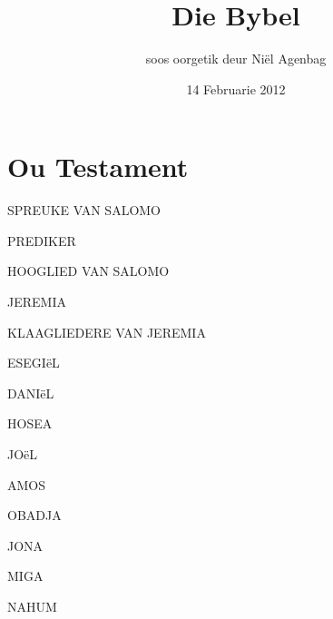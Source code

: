 \documentclass[twoside,twocolumn,letterpaper]{book}
\newcommand{\jnumChapters}{0}
\begin{document}
\frontmatter

\title{Die Bybel}
\date{14 Februarie 2012}
\author{soos oorgetik deur Ni\"el Agenbag}
\setlength{\columnseprule}{0pt}
\maketitle

\mainmatter

\part*{Ou Testament}
\setlength{\columnseprule}{0.0pt}
\renewcommand{\jnumChapters}{0}









































SPREUKE VAN SALOMO

PREDIKER

HOOGLIED VAN SALOMO



JEREMIA

KLAAGLIEDERE VAN JEREMIA

ESEGIëL

DANIëL

HOSEA

JOëL

AMOS

OBADJA

JONA

MIGA

NAHUM
\end{document}
